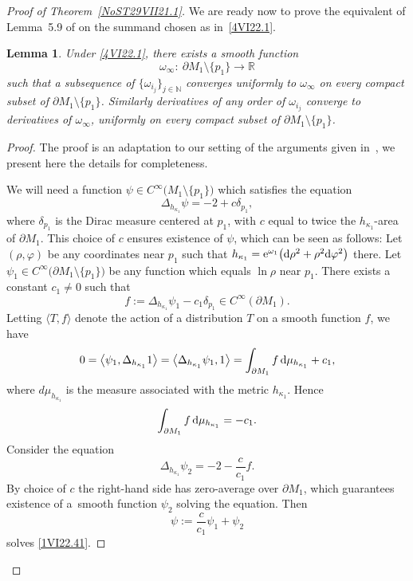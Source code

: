 \documentclass[pdftex]{sigma}
\numberwithin{equation}{section}
\newtheorem{Lemma}[Theorem]{Lemma}
\newcommand{\R}{\mathbb R}
\newcommand{\N}{\mathbb N}
\newcommand{\mv}{\omega}%
\begin{document}
\begin{proof}[Proof of Theorem~\ref{NoST29VII21.1}]
We are ready now to prove the equivalent of Lemma~5.9 of \cite{CDW} on the summand chosen as in~\eqref{4VI22.1}.

\begin{Lemma} \label{NoSL23X21.2}
Under \eqref{4VI22.1}, there exists a smooth function
\[
 \mv_\infty\colon \ \partial M_1\setminus \{p_1\} \to \R
\]
such that a subsequence of $\{\mv_{i_j}\}_{j\in\N}$ converges uniformly to $\mv_\infty$ on every compact subset of $\partial M_1\setminus \{p_1\}$.
Similarly derivatives of any order of $\mv_{i_j}$ converge to derivatives of $\mv_\infty$, uniformly on every compact subset of $\partial M_1\setminus \{p_1\}$.
\end{Lemma}

\begin{proof}
The proof is an adaptation to our setting of the arguments given in~\cite{CDW}, we present here the details for completeness.

We will need a function $\psi\in C^\infty\big(M_1\setminus \{p_1\}\big)$ which satisfies the equation
\begin{equation}\label{1VI22.41}
 \Delta_{h_{\kappa_1}} \psi = -2 + c \delta_{p_1},
\end{equation}
where $\delta_{p_1}$ is the Dirac measure centered at $p_1$, with $c$ equal to twice the $h_{\kappa_1}$-area of $\partial M_1$. This choice of $c$ ensures existence of $\psi$, which can be seen as follows:
Let $(\rho,\varphi)$ be any coordinates near $p_1$ such that $h_{\kappa_1} = {\rm e}^{\omega_1}\big( {\rm d}\rho^2 + \rho^2 {\rm d}\varphi^2\big)$ there. Let $\psi_1\in C^\infty\big(\partial M_1\setminus \{p_1\}\big)$ be any function which equals $\ln \rho$ near $p_1$. There exists a constant $c_1\ne 0 $ such
that
%
\[
f:= \Delta_{h_{\kappa_1}} \psi_1 -c_1 \delta_{p_1}\in C^\infty(\partial M_1).
\]
Letting $\langle T,f\rangle$ denote the action of a distribution $T$ on a smooth function $f$, we have
\begin{equation*}%
 0 = \big\langle \psi_1, \Delta_{h_{\kappa_1}} 1\big\rangle
 = \big\langle \Delta_{h_{\kappa_1}} \psi_1, 1\big\rangle
 = \int_{\partial M_1} f \, {\rm d}\mu_{h_{\kappa_1} } + c_1,
\end{equation*}
where $d\mu_{h_{\kappa_1} }$ is the measure associated with the metric ${h_{\kappa_1} }$.
Hence
\begin{equation*}%
 \int_{\partial M_1} f \, {\rm d}\mu_{h_{\kappa_1} } = -c_1.
\end{equation*}
Consider the equation
\begin{equation*}%
 \Delta_{h_{\kappa_1}} \psi_2 = -2 -\frac{c}{c_1} f.
\end{equation*}
By choice of $c$ the right-hand side has zero-average over $\partial M_1$, which guarantees existence of a~smooth function $\psi_2$ solving the equation. Then{\samepage
\begin{equation*}%
 \psi := \frac{c}{c_1} \psi_1 + \psi_2
\end{equation*}
solves \eqref{1VI22.41}.}


\end{proof}
\end{proof}
\end{document}

